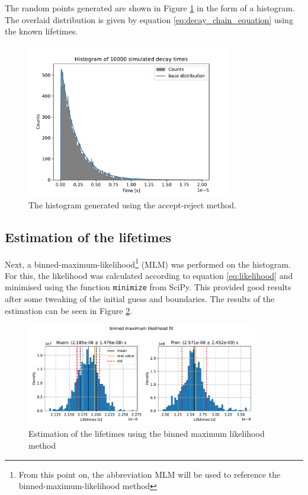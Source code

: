 \documentclass[11pt, a4paper, oneside]{book}
\newcommand\Plotwidth{0.8}
\newcommand\DoublePlotwidth{0.9}
\begin{document}
The random points generated are shown in Figure \ref{fig:histogram} in the form of a histogram. The overlaid distribution is given by equation \ref{eq:decay_chain_equation} using the known lifetimes.


\begin{figure}[H]
    \centering
    \includegraphics[width=\Plotwidth\textwidth]{images/simulated_decay_histogram_150bins.pdf}
    \caption{The histogram generated using the accept-reject method.}
    \label{fig:histogram}
\end{figure}

\subsection{Estimation of the lifetimes}

Next, a binned-maximum-likelihood\footnote{From this point on, the abbreviation MLM will be used to reference the binned-maximum-likelihood method} (MLM) was performed on the histogram. For this, the likelihood was calculated according to equation \ref{eq:likelihood} and minimised using the function \lstinline{minimize} from SciPy. This provided good results after some tweaking of the initial guess and boundaries. The results of the estimation can be seen in Figure \ref{fig:likelihood_results}.

\begin{figure}[h]
    \centering
    \includegraphics[width=\DoublePlotwidth\textwidth]{images/estimators_hist_likelihood.pdf}
    \caption{Estimation of the lifetimes using the binned maximum likelihood method}
    \label{fig:likelihood_results}
\end{figure}
\end{document}
